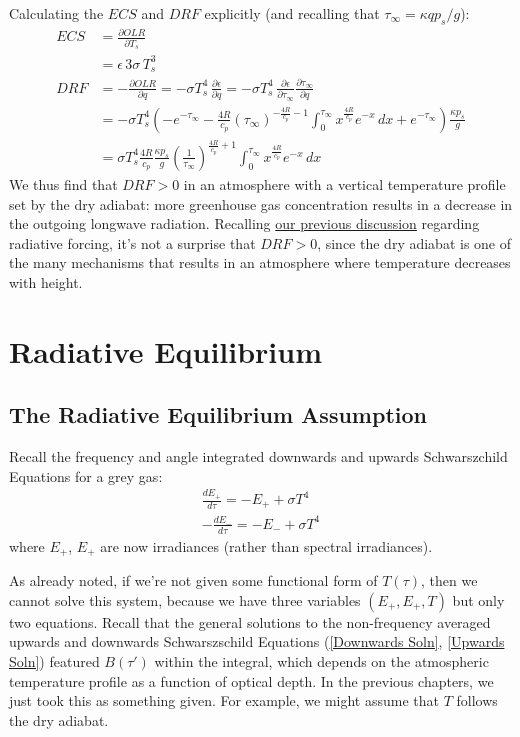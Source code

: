 Calculating the $ECS$ and $DRF$ explicitly (and recalling that $\tau_\infty=\kappa q p_s/g$):
\begin{align*}
    ECS &=\frac{\partial OLR}{\partial T_s}\\
    &=\epsilon\, 3\sigma\, T_s^3
    \\
    DRF &= -\frac{\partial OLR}{\partial q}=-\sigma T_s^4 \,\frac{\partial \epsilon}{\partial q} 
    =-\sigma T_s^4 \,\frac{\partial \epsilon}{\partial \tau_\infty} \frac{\partial \tau_\infty}{\partial q}
    \\
    &= -\sigma T_s^4 \left( -e^{-\tau_\infty} - 
    \frac{4R}{c_p}
    \left( \tau_\infty \right)^{-\frac{4R}{c_p}-1}
    \int_0^{\tau_\infty}
    x^{\frac{4R}{c_p}}
    e^{-x}
    \,dx
    +
    e^{-\tau_\infty}
    \right)
    \frac{\kappa p_s}{g}
    \\
    &=\sigma T_s^4 \frac{4R}{c_p}\frac{\kappa p_s}{g} \left( \frac{1}{\tau_\infty} \right)^{\frac{4R}{c_p}+1}
    \int_0^{\tau_\infty}
    x^{\frac{4R}{c_p}}
    e^{-x}
    \,dx
\end{align*}
We thus find that $DRF>0$ in an atmosphere with a vertical temperature profile set by the dry adiabat: more greenhouse gas concentration results in a decrease in the outgoing longwave radiation. Recalling \hyperref[RF Box Takeaway]{our previous discussion} regarding radiative forcing, it's not a surprise that $DRF>0$, since the dry adiabat is one of the many mechanisms that results in an atmosphere where temperature decreases with height.

\chapter{Radiative Equilibrium}

\section{The Radiative Equilibrium Assumption}

Recall the frequency and angle integrated downwards and upwards Schwarszchild Equations for a grey gas:
\begin{align*}
    \frac{dE_+}{d\tau}=-E_++\sigma T^4 \\
    -\frac{dE_-}{d\tau}=-E_-+\sigma T^4
\end{align*}
where $E_+$, $E_+$ are now irradiances (rather than spectral irradiances).

As already noted, if we're not given some functional form of $T(\tau)$, then we cannot solve this system, because we have three variables $(E_+,E_+,T)$ but only two equations. Recall that the general solutions to the non-frequency averaged upwards and downwards Schwarszschild Equations (\ref{Downwards Soln}, \ref{Upwards Soln}) featured $B(\tau')$ within the integral, which depends on the atmospheric temperature profile as a function of optical depth. In the previous chapters, we just took this as something given. For example, we might assume that $T$ follows the dry adiabat.

